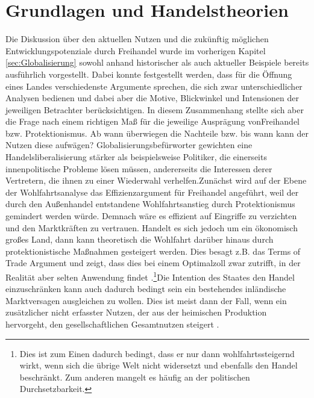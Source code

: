 \section{Grundlagen und Handelstheorien}\label{Handelstheorien}
Die Diskussion {\"u}ber den aktuellen Nutzen und die zukünftig m{\"o}glichen Entwicklungspotenziale durch Freihandel wurde im vorherigen Kapitel \ref{sec:Globalisierung} sowohl anhand historischer als auch aktueller Beispiele bereits ausführlich vorgestellt. \newline Dabei konnte festgestellt werden, dass f{\"u}r die {\"O}ffnung eines Landes  verschiedenste Argumente sprechen, die sich zwar unterschiedlicher Analysen bedienen und dabei aber die Motive, Blickwinkel und Intensionen der jeweiligen Betrachter ber{\"u}cksichtigen. In diesem Zusammenhang stellte sich aber die Frage nach einem richtigen Ma{\ss} f{\"u}r die jeweilige Ausprägung vonFreihandel bzw. Protektionismus. Ab wann {\"u}berwiegen die Nachteile bzw.  bis wann kann der Nutzen diese aufw{\"a}gen? Globalisierungsbef{\"u}rworter gewichten eine Handelsliberalisierung st{\"a}rker als beispielsweise Politiker, die einerseits innenpolitische Probleme l{\"o}sen m{\"u}ssen, andererseits die Interessen derer Vertretern, die ihnen zu einer Wiederwahl verhelfen.\newline Zun{\"a}chst wird auf der Ebene der Wohlfahrtsanalyse das Effizienzargument f{\"u}r Freihandel angef{\"u}hrt, weil der durch den Au{\ss}enhandel entstandene Wohlfahrtsanstieg durch Protektionismus gemindert werden w{\"u}rde. Demnach wäre es effizient auf Eingriffe zu verzichten und den Marktkr{\"a}ften zu vertrauen.
Handelt es sich jedoch um ein {\"o}konomisch gro{\ss}es Land, dann kann theoretisch die Wohlfahrt dar{\"u}ber hinaus durch protektionistische Ma{\ss}nahmen gesteigert werden. Dies besagt z.B. das Terms of Trade Argument und zeigt, dass dies bei einem Optimalzoll zwar zutrifft, in der Realit{\"a}t aber selten Anwendung findet \citep{Ventura.1997,  Acemoglu.2002}.\footnote{Dies ist zum Einen dadurch bedingt, dass er nur dann wohlfahrtssteigernd wirkt, wenn sich die übrige Welt nicht widersetzt und ebenfalls den Handel beschränkt. Zum anderen mangelt es häufig an der politischen Durchsetzbarkeit.}\newline Die Intention des Staates den Handel einzuschr{\"a}nken kann auch dadurch bedingt sein ein bestehendes inl{\"a}ndische Marktversagen ausgleichen zu wollen. Dies ist meist dann der Fall, wenn ein zus{\"a}tzlicher nicht erfasster Nutzen, der aus der heimischen Produktion hervorgeht, den gesellschaftlichen Gesamtnutzen steigert \citep[Kapitel 10]{Krugman.2015}.\newline


